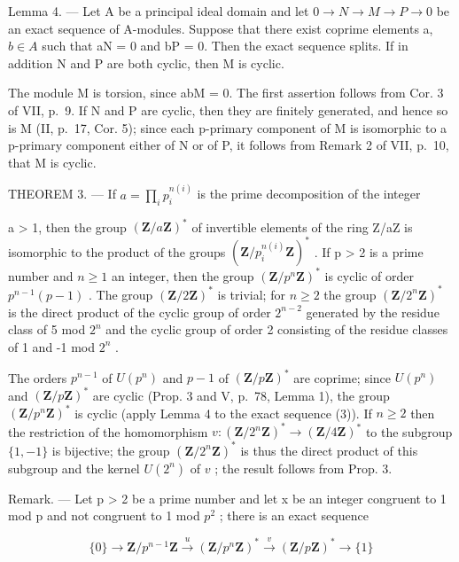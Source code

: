 Lemma 4. --- Let A be a principal ideal domain and let \(0 \rightarrow N \rightarrow M \rightarrow P \rightarrow 0\) be an exact sequence of A-modules. Suppose that there exist coprime elements a, \(b \in A\) such that aN = 0 and bP = 0. Then the exact sequence splits. If in addition N and P are both cyclic, then M is cyclic.

The module M is torsion, since abM = 0. The first assertion follows from Cor. 3 of VII, p.~9. If N and P are cyclic, then they are finitely generated, and hence so is M (II, p.~17, Cor. 5); since each p-primary component of M is isomorphic to a p-primary component either of N or of P, it follows from Remark 2 of VII, p.~10, that M is cyclic.

THEOREM 3. --- If \(a = \prod_{i} p_{i}^{n(i)}\) is the prime decomposition of the integer

a \textgreater{} 1, then the group \((\mathbf{Z}/a\mathbf{Z})^{*}\) of invertible elements of the ring Z/aZ is isomorphic to the product of the groups \((\mathbf{Z}/p_{i}^{n(i)}\mathbf{Z})^{*}\) . If p \textgreater{} 2 is a prime number and \(n \geqslant 1\) an integer, then the group \((\mathbf{Z}/p^{n}\mathbf{Z})^{*}\) is cyclic of order \(p^{n-1}(p - 1)\) . The group \((\mathbf{Z}/2\mathbf{Z})^{*}\) is trivial; for \(n \geqslant 2\) the group \((\mathbf{Z}/2^{n}\mathbf{Z})^{*}\) is the direct product of the cyclic group of order \(2^{n-2}\) generated by the residue class of 5 mod \(2^{n}\) and the cyclic group of order 2 consisting of the residue classes of 1 and -1 mod \(2^{n}\) .

The orders \(p^{n-1}\) of \(U(p^n)\) and \(p-1\) of \((\mathbf{Z}/p\mathbf{Z})^*\) are coprime; since \(U(p^n)\) and \((\mathbf{Z}/p\mathbf{Z})^*\) are cyclic (Prop. 3 and V, p.~78, Lemma 1), the group \((\mathbf{Z}/p^n\mathbf{Z})^*\) is cyclic (apply Lemma 4 to the exact sequence (3)). If \(n \geqslant 2\) then the restriction of the homomorphism \(v: (\mathbf{Z}/2^n\mathbf{Z})^* \to (\mathbf{Z}/4\mathbf{Z})^*\) to the subgroup \(\{1, -1\}\) is bijective; the group \((\mathbf{Z}/2^n\mathbf{Z})^*\) is thus the direct product of this subgroup and the kernel \(U(2^n)\) of \(v\) ; the result follows from Prop. 3.

Remark. --- Let p \textgreater{} 2 be a prime number and let x be an integer congruent to 1 mod p and not congruent to 1 mod \(p^{2}\) ; there is an exact sequence

\[
\{0 \} \rightarrow \mathbf {Z} / p ^ {n - 1} \mathbf {Z} \xrightarrow {u} (\mathbf {Z} / p ^ {n} \mathbf {Z}) ^ {*} \xrightarrow {v} (\mathbf {Z} / p \mathbf {Z}) ^ {*} \rightarrow \{1 \}\tag{5}
\]

